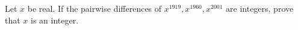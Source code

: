 Let $x$ be real. If the pairwise differences of $x^{1919},x^{1960},x^{2001}$ are integers, prove that $x$ is an integer.
